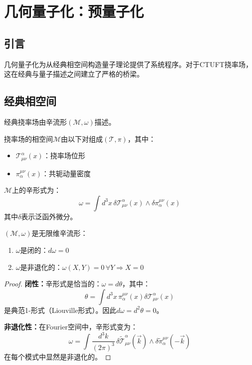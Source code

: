 \section{几何量子化：预量子化}
\label{sec:prequantization}

\subsection{引言}

几何量子化\cite{woodhouse1997}为从经典相空间构造量子理论提供了系统程序。对于CTUFT挠率场，这在经典与量子描述之间建立了严格的桥梁。

\subsection{经典相空间}

经典挠率场由辛流形$(\mathcal{M}, \omega)$描述。

\begin{definition}[相空间]
挠率场的相空间$\mathcal{M}$由以下对组成$(\mathcal{T}, \pi)$，其中：
\begin{itemize}
    \item $\mathcal{T}^\alpha_{\mu\nu}(x)$：挠率场位形
    \item $\pi_\alpha^{\mu\nu}(x)$：共轭动量密度
\end{itemize}
\end{definition}

\begin{definition}[辛形式]
$\mathcal{M}$上的辛形式为：
\begin{equation}
    \omega = \int d^3x \, \delta \mathcal{T}^\alpha_{\mu\nu}(x) \wedge \delta \pi_\alpha^{\mu\nu}(x)
\end{equation}
其中$\delta$表示泛函外微分。
\end{definition}

\begin{theorem}[辛结构]
$(\mathcal{M}, \omega)$是无限维辛流形：
\begin{enumerate}
    \item $\omega$是闭的：$d\omega = 0$
    \item $\omega$是非退化的：$\omega(X, Y) = 0 \, \forall Y \Rightarrow X = 0$
\end{enumerate}
\end{theorem}

\begin{proof}
\textbf{闭性：}辛形式是恰当的：$\omega = d\theta$，其中：
\begin{equation}
    \theta = \int d^3x \, \pi_\alpha^{\mu\nu}(x) \delta \mathcal{T}^\alpha_{\mu\nu}(x)
\end{equation}
是典范1-形式（Liouville形式）。因此$d\omega = d^2\theta = 0$。

\textbf{非退化性：}在Fourier空间中，辛形式变为：
\begin{equation}
    \omega = \int \frac{d^3k}{(2\pi)^3} \, \delta \tilde{\mathcal{T}}^\alpha_{\mu\nu}(\vec{k}) \wedge \delta \tilde{\pi}_\alpha^{\mu\nu}(-\vec{k})
\end{equation}
在每个模式中显然是非退化的。
\end{proof}


